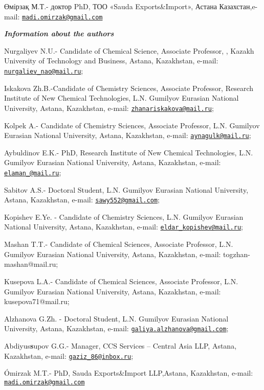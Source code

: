 \begin{authorinfo}
Өмірзақ М.Т.- доктор PhD, ТОО «Sauda Exports\&Import», Астана
Казахстан,e-mail:
\href{mailto:madi.omirzak@gmail.com}{\nolinkurl{madi.omirzak@gmail.com}}

\hspace{1em}\emph{{\bfseries Information about the authors}}

Nurgaliyev N.U.- Candidate of Chemical Science, Associate Professor, ,
Kazakh University of Technology and Business, Astana, Kazakhstan,
e-mail:
\href{mailto:nurgaliev_nao@mail.ru}{\nolinkurl{nurgaliev\_nao@mail.ru}};

Iskakova Zh.B.-Candidate of Chemistry Sciences, Associate Professor,
Research Institute of New Chemical Technologies, L.N. Gumilyov Eurasian
National University, Astana, Kazakhstan, e-mail:
\href{mailto:zhanariskakova@mail.ru}{\nolinkurl{zhanariskakova@mail.ru}};

Kolpek A.- Candidate of Chemistry Sciences, Associate Professor, L.N.
Gumilyov Eurasian National University, Astana, Kazakhstan, e-mail:
\href{mailto:aynagulk@mail.ru}{\nolinkurl{aynagulk@mail.ru}};

Aybuldinov E.K.- PhD, Research Institute of New Chemical Technologies,
L.N. Gumilyov Eurasian National University, Astana, Kazakhstan, e-mail:
\href{mailto:elaman_@mail.ru}{\nolinkurl{elaman\_@mail.ru}};

Sabitov A.S.- Doctoral Student, L.N. Gumilyov Eurasian National
University, Astana, Kazakhstan, e-mail:
\href{mailto:sawy552@gmail.com}{\nolinkurl{sawy552@gmail.com}};

Kopishev E.Ye. - Candidate of Chemistry Sciences, L.N. Gumilyov Eurasian
National University, Astana, Kazakhstan, e-mail:
\href{mailto:eldar_kopishev@mail.ru}{\nolinkurl{eldar\_kopishev@mail.ru}};

Mashan T.T.- Candidate of Chemical Sciences, Associate Professor, L.N.
Gumilyov Eurasian National University, Astana, Kazakhstan, e-mail:
togzhan-mashan@mail.ru;

Kusepova L.A.- Candidate of Chemical Sciences, Associate Professor, L.N.
Gumilyov Eurasian National University, Astana, Kazakhstan, e-mail:
kusepova71@mail.ru;

Alzhanova G.Zh. - Doctoral Student, L.N. Gumilyov Eurasian National
University, Astana, Kazakhstan, e-mail:
\href{mailto:galiya.alzhanova@gmail.com}{\nolinkurl{galiya.alzhanova@gmail.com}};

Abdiyus{\bfseries s}upov G.G.- Manager, CCS Services -- Central Asia LLP,
Astana, Kazakhstan, e-mail:
\href{mailto:gaziz_86@inbox.ru}{\nolinkurl{gaziz\_86@inbox.ru}};

Ómirzak M.T.- PhD, Sauda Exports\&Import LLP,Astana, Kazakhstan, e-mail:
\href{mailto:madi.omirzak@gmail.com}{\nolinkurl{madi.omirzak@gmail.com}}
\end{authorinfo}
